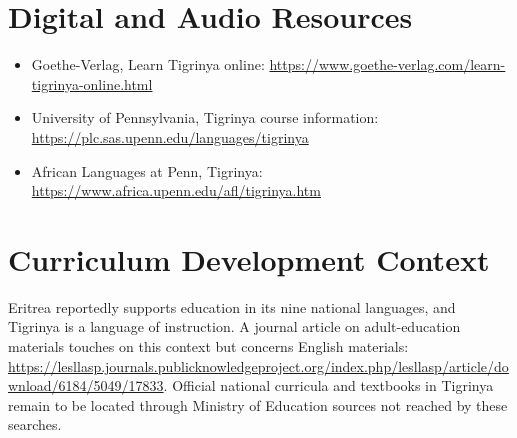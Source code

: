 \documentclass[12pt]{article}
\begin{document}
\section{Digital and Audio Resources}
\begin{itemize}
\item Goethe-Verlag, Learn Tigrinya online: \url{https://www.goethe-verlag.com/learn-tigrinya-online.html}
\item University of Pennsylvania, Tigrinya course information: \url{https://plc.sas.upenn.edu/languages/tigrinya}
\item African Languages at Penn, Tigrinya: \url{https://www.africa.upenn.edu/afl/tigrinya.htm}
\end{itemize}

\section{Curriculum Development Context}
Eritrea reportedly supports education in its nine national languages, and Tigrinya is a language of instruction. A journal article on adult-education materials touches on this context but concerns English materials: \url{https://lesllasp.journals.publicknowledgeproject.org/index.php/lesllasp/article/download/6184/5049/17833}. Official national curricula and textbooks in Tigrinya remain to be located through Ministry of Education sources not reached by these searches.
\end{document}

